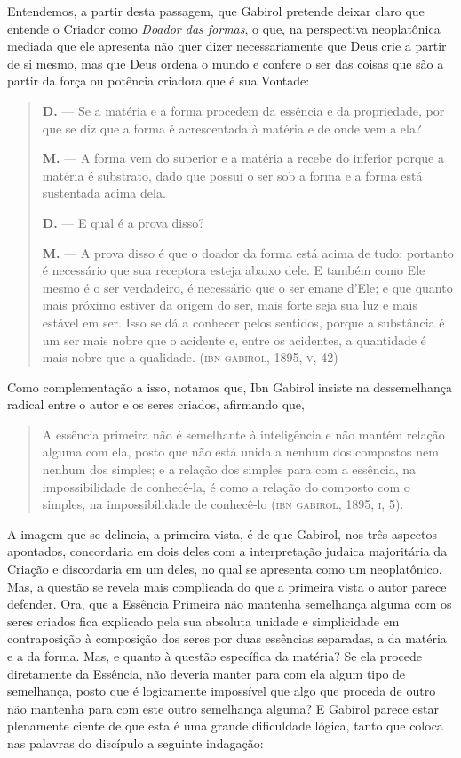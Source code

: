 Entendemos, a partir desta passagem, que Gabirol pretende deixar
claro que entende o Criador como \emph{Doador das formas}, o que,
na perspectiva neoplatônica mediada que ele apresenta não quer dizer
necessariamente que Deus crie a partir de si mesmo, mas que Deus
ordena o mundo e confere o ser das coisas que são a partir da força
ou potência criadora que é sua Vontade:

\begin{quote}
\textbf{D.} --- Se a matéria e a forma procedem da essência e da
propriedade, por que se diz que a forma é acrescentada à matéria e de
onde vem a ela?

\textbf{M.} --- A forma vem do superior e a matéria a recebe do inferior
porque a matéria é substrato, dado que possui o ser sob a forma e a
forma está sustentada acima dela.

\textbf{D.} --- E qual é a prova disso?

\textbf{M.} --- A prova disso é que o doador da forma está acima de
tudo; portanto é necessário que sua receptora esteja abaixo dele. E
também como Ele mesmo é o ser verdadeiro, é necessário que o ser
emane d'Ele; e que quanto mais próximo estiver da origem do ser, mais
forte seja sua luz e mais estável em ser. Isso se dá a conhecer pelos
sentidos, porque a substância é um ser mais nobre que o acidente e,
entre os acidentes, a quantidade é mais nobre que a qualidade.
(\textsc{ibn}
\textsc{gabirol}, 1895, \textsc{v}, 42)
\end{quote}

Como complementação a isso, notamos que, Ibn Gabirol insiste na
dessemelhança radical entre o autor e os seres criados, afirmando
que, 

\begin{quote}
A essência primeira não é semelhante à inteligência e não mantém
relação alguma com ela, posto que não está unida a nenhum dos
compostos nem nenhum dos simples; e a relação dos simples para com a
essência, na impossibilidade de conhecê-la, é como a relação do
composto com o simples, na impossibilidade de conhecê-lo (\textsc{ibn}
\textsc{gabirol}, 1895, \textsc{i}, 5). 
\end{quote}

A imagem que se delineia, a primeira vista, é de que Gabirol, nos três
aspectos apontados, concordaria em dois deles com a interpretação
judaica majoritária da Criação e discordaria em um deles, no qual se
apresenta como um neoplatônico. Mas, a questão se revela mais
complicada do que a primeira vista o autor parece defender. Ora, que
a Essência Primeira não mantenha semelhança alguma com os seres
criados fica explicado pela sua absoluta unidade e simplicidade em
contraposição à composição dos seres por duas essências separadas, a
da matéria e a da forma. Mas, e quanto à questão específica da
matéria? Se ela procede diretamente da Essência, não deveria manter
para com ela algum tipo de semelhança, posto que é logicamente
impossível que algo que proceda de outro não mantenha para com este
outro semelhança alguma? E Gabirol parece estar plenamente ciente de
que esta é uma grande dificuldade lógica, tanto que coloca nas
palavras do discípulo a seguinte indagação: 

